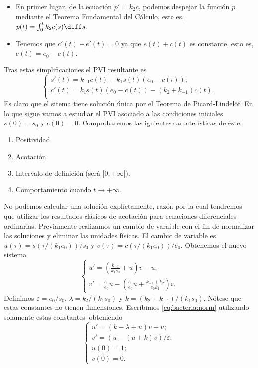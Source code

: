 \documentclass{article}
\begin{document}
\begin{ex}
  \begin{itemize}
  \item En primer lugar, de la ecuación $p' = k_2 c$, podemos despejar la función $p$ mediante el
    Teorema Fundamental del Cálculo, esto es, $p(t) = \int_0^{t} k_2c(s) \diff s$.
  \item Tenemos que $c'(t) + e'(t) = 0$ ya que $e(t)+c(t)$ es constante, esto es,
    $e(t) = e_0 - c(t)$.
  \end{itemize}
  Tras estas simplificaciones el PVI resultante es
  \begin{equation}
    \label{eq:bacteria:simplificada}
    \begin{cases}
      s'(t) = k_{-1}c(t) - k_1 s(t) (e_0 - c(t)); \\
      c'(t) = k_1 s(t) (e_0 - c(t)) - (k_2 + k_{-1})c(t). \\
    \end{cases}
  \end{equation}
  Es claro que el sitema tiene solución única por el Teorema de Picard-Lindelöf. En lo que sigue
  vamos a estudiar el PVI asociado a las condiciones iniciales $s(0) = s_0$ y $c(0) =
  0$. Comprobaremos las iguientes características de éste:
  \begin{enumerate}
  \item Positividad.
  \item Acotación.
  \item Intervalo de definición (será $[0, +\infty[$).
  \item Comportamiento cuando $t \to +\infty$.
  \end{enumerate}
  No podemos calcular una solución explíctamente, razón por la cual tendremos que utilizar los
  resultados clásicos de acotación para ecuaciones diferenciales ordinarias. Previamente realizamos
  un cambio de varaible con el fin de normalizar las soluciones y eliminar las unidades físicas. El
  cambio de variable es $u(\tau) = s(\tau / (k_1 e_0)) / s_0$ y
  $v(\tau) = c(\tau / (k_1 e_0)) / e_0$. Obtenemos el nuevo sistema
  \begin{equation}
    \label{eq:bacteria:norm}
    \begin{cases}
      u' = \left(\frac{k_{-1}}{k_1 s_0} + u \right) v -u; \\
      v' = \frac{s_0}{e_0} u - \left( \frac{s_0}{e_0} u + \frac{k_{-1} + k_2}{e_0k_1} \right)v.
    \end{cases}
  \end{equation}
  Definimos $\varepsilon = e_0 / s_0$, $\lambda = k_2 / (k_1 s_0)$ y
  $k = (k_2 + k_{-1}) / (k_1 s_0)$. Nótese que estas constantes no tienen dimensiones. Escribimos
  \eqref{eq:bacteria:norm} utilizando solamente estas constantes, obteniendo
  \begin{equation}
    \label{eq:bacteria:adi}
    \begin{cases}
      u' = \left(k-\lambda +u \right) v - u; \\
      v' =  (u - (u+k)v) / \varepsilon; \\
      u(0) = 1; \\
      v(0) = 0.
    \end{cases}
  \end{equation}


\end{ex}
\end{document}
